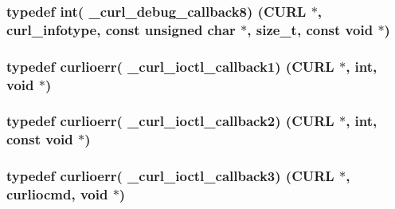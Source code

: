 \subsubsection[{\+\_\+curl\+\_\+debug\+\_\+callback8}]{\setlength{\rightskip}{0pt plus 5cm}typedef int( \+\_\+curl\+\_\+debug\+\_\+callback8) ({\bf C\+U\+R\+L} $\ast$, {\bf curl\+\_\+infotype}, const unsigned char $\ast$, size\+\_\+t, const void $\ast$)}\label{typecheck-gcc_8h_a5c3caa775cdc5419a7934129fe16eae8}
\hypertarget{typecheck-gcc_8h_aac1891bdfef140df9bb64a06ed047fcc}{}
\subsubsection[{\+\_\+curl\+\_\+ioctl\+\_\+callback1}]{\setlength{\rightskip}{0pt plus 5cm}typedef {\bf curlioerr}( \+\_\+curl\+\_\+ioctl\+\_\+callback1) ({\bf C\+U\+R\+L} $\ast$, int, void $\ast$)}\label{typecheck-gcc_8h_aac1891bdfef140df9bb64a06ed047fcc}
\hypertarget{typecheck-gcc_8h_afcf7a9e1d185d392c778b714db3112d1}{}
\subsubsection[{\+\_\+curl\+\_\+ioctl\+\_\+callback2}]{\setlength{\rightskip}{0pt plus 5cm}typedef {\bf curlioerr}( \+\_\+curl\+\_\+ioctl\+\_\+callback2) ({\bf C\+U\+R\+L} $\ast$, int, const void $\ast$)}\label{typecheck-gcc_8h_afcf7a9e1d185d392c778b714db3112d1}
\hypertarget{typecheck-gcc_8h_ae7c200fd4adb189b92a5373f59711ef8}{}
\subsubsection[{\+\_\+curl\+\_\+ioctl\+\_\+callback3}]{\setlength{\rightskip}{0pt plus 5cm}typedef {\bf curlioerr}( \+\_\+curl\+\_\+ioctl\+\_\+callback3) ({\bf C\+U\+R\+L} $\ast$, {\bf curliocmd}, void $\ast$)}\label{typecheck-gcc_8h_ae7c200fd4adb189b92a5373f59711ef8}
\hypertarget{typecheck-gcc_8h_ab1a3806b61adfbc7040daf6f6d115f02}{}
